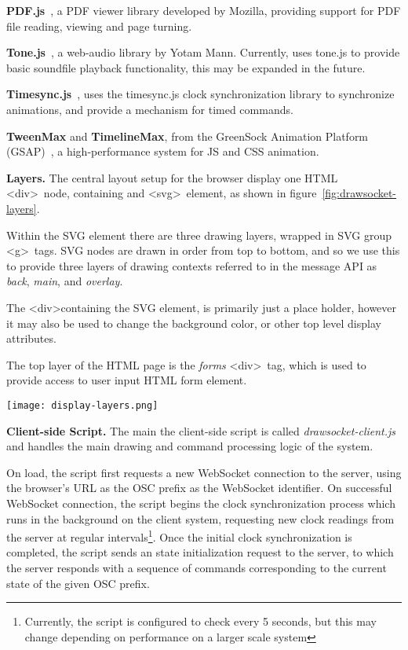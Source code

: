 \textbf{PDF.js}~\cite{pdfjs}, a PDF viewer library developed by Mozilla, providing support for PDF file reading, viewing and page turning.

\textbf{Tone.js}~\cite{mann2015interactive}, a web-audio library by Yotam Mann. Currently, \drawsocket uses tone.js to provide basic soundfile playback functionality, this may be expanded in the future.

\textbf{Timesync.js}~\cite{timesync}, \drawsocket uses the timesync.js clock synchronization library to synchronize animations, and provide a mechanism for timed commands.

 \textbf{TweenMax} and \textbf{TimelineMax}, from the GreenSock Animation Platform (GSAP)~\cite{gsap}, a high-performance system for JS and CSS animation.

\medskip
\noindent
\textbf{Layers.}
The central layout setup for the browser display one HTML  \textless div\textgreater\ node, containing and \textless svg\textgreater\ element, as shown in figure~\ref{fig:drawsocket-layers}.

Within the SVG element there are three drawing layers, wrapped in SVG group \textless g\textgreater\ tags.
SVG nodes are drawn in order from top to bottom, and so we use this to provide three layers of drawing contexts referred to in the message API as \textit{back}, \textit{main}, and \textit{overlay}.

The \textless div\textgreater containing the SVG element, is primarily just a place holder, however it may also be used to change the background color, or other top level display attributes.

The top layer of the HTML page is the \textit{forms} \textless div\textgreater\ tag, which is used to provide access to user input HTML form element.

\begin{figure*}[]
\centering
\texttt{[image: display-layers.png]}
\caption{\drawsocket display layers. 
\label{fig:drawsocket-layers}}
\end{figure*}

\medskip
\noindent
\textbf{Client-side Script.} 
The main the client-side script is called \textit{drawsocket-client.js} and handles the main drawing and command processing logic of the system.

On load, the script first requests a new WebSocket connection to the server, using the browser's URL as the OSC prefix as the WebSocket identifier. On successful WebSocket connection, the script begins the clock synchronization process which runs in the background on the client system, requesting new clock readings from the server at regular intervals\footnote{Currently, the script is configured to check every 5 seconds, but this may change depending on performance on a larger scale system}. Once the initial clock synchronization is completed, the script sends an state initialization request to the server, to which the server responds with a sequence of commands corresponding to the current state of the given OSC prefix.

